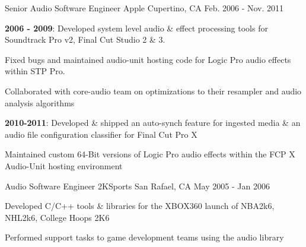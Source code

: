\begin{cventries}
  \cventry
    {Senior Audio Software Engineer} %
    {Apple} %
    {Cupertino, CA} %
    {Feb. 2006 - Nov. 2011} %
    {
      \begin{cvitems} %
        \item {\textbf{2006 - 2009}: Developed system level audio \& effect processing tools for Soundtrack Pro v2, Final Cut Studio 2 \& 3}. 
        \item {Fixed bugs and maintained audio-unit hosting code for Logic Pro audio effects within STP Pro.}
        \item {Collaborated with core-audio team on optimizations to their resampler and audio analysis algorithms}
        \item {\textbf{2010-2011}: Developed \& shipped an auto-synch feature for ingested media \& an audio file configuration classifier for Final Cut Pro X}
		\item {Maintained custom 64-Bit versions of Logic Pro audio effects within the FCP X Audio-Unit hosting environment}
      \end{cvitems}
    }

  \cventry
    {Audio Software Engineer} %
    {2KSports} %
    {San Rafael, CA} %
    {May 2005 - Jan 2006} %
    {
      \begin{cvitems} %
        \item {Developed C/C++ tools \& libraries for the XBOX360 launch of NBA2k6, NHL2k6, College Hoops 2K6}
        \item {Performed support tasks to game development teams using the audio library}
      \end{cvitems}
    }

\end{cventries}
	